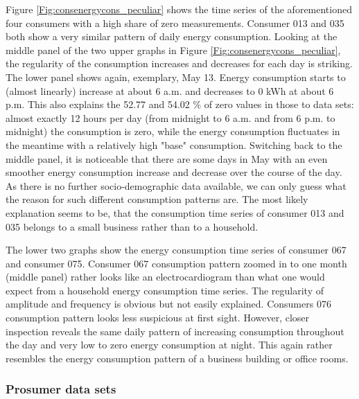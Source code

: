 Figure \ref{Fig:consenergycons_peculiar} shows the time series of the aforementioned four consumers with a high share of zero measurements. Consumer 013 and 035 both show a very similar pattern of daily energy consumption. Looking at the middle panel of the two upper graphs in Figure \ref{Fig:consenergycons_peculiar}, the regularity of the consumption increases and decreases for each day is striking. The lower panel shows again, exemplary, May 13. Energy consumption starts to (almost linearly) increase at about 6 a.m. and decreases to 0 kWh at about 6 p.m. This also explains the 52.77 and 54.02 \% of zero values in those to data sets: almost exactly 12 hours per day (from midnight to 6 a.m. and from 6 p.m. to midnight) the consumption is zero, while the energy consumption fluctuates in the meantime with a relatively high "base" consumption. Switching back to the middle panel, it is noticeable that there are some days in May with an even smoother energy consumption increase and decrease over the course of the day. As there is no further socio-demographic data available, we can only guess what the reason for such different consumption patterns are. The most likely explanation seems to be, that the consumption time series of consumer 013 and 035 belongs to a small business rather than to a household.

The lower two graphs show the energy consumption time series of consumer 067 and consumer 075. Consumer 067 consumption pattern zoomed in to one month (middle panel) rather looks like an electrocardiogram than what one would expect from a household energy consumption time series. The regularity of amplitude and frequency is obvious but not easily explained. Consumers 076 consumption pattern looks less suspicious at first sight. However, closer inspection reveals the same daily pattern of increasing consumption throughout the day and very low to zero energy consumption at night. This again rather resembles the energy consumption pattern of a business building or office rooms.



\subsubsection{Prosumer data sets}

